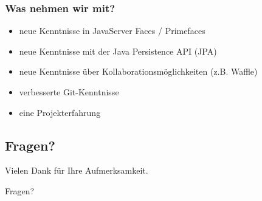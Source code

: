 \documentclass{beamer}
\begin{document}
\begin{frame}
\frametitle{Was nehmen wir mit?}
\begin{itemize}
\item neue Kenntnisse in JavaServer Faces / Primefaces
\item neue Kenntnisse mit der Java Persistence API (JPA)
\item neue Kenntnisse über Kollaborationsmöglichkeiten (z.B. Waffle)
\item verbesserte Git-Kenntnisse
\item eine Projekterfahrung
\end{itemize}
\end{frame}

\begin{frame}

\section{Fragen?}
\begin{center}

\Large
Vielen Dank für Ihre Aufmerksamkeit. \\\hspace{20pt}

\huge
{ Fragen?}
\end{center}
\end{frame}
\end{document}
